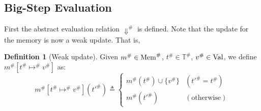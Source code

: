 \documentclass[acmsmall,screen]{acmart}
\theoremstyle{definition}
\newtheorem{definition}{Definition}[section]
\newcommand*{\A}[1]{{#1}^{\#}}
\newcommand*{\Time}{\mathbb{T}}
\newcommand*{\ATime}{\A{\Time}}
\newcommand*{\Value}[1]{\text{Val}\vphantom{#1}}
\newcommand*{\mem}{m}
\newcommand*{\AMem}[1]{\A{\text{Mem}}\vphantom{#1}}
\begin{document}
\subsection{Big-Step Evaluation}

First the abstract evaluation relation $\A{\Downarrow}$ is defined.
Note that the update for the memory is now a weak update. That is,
\begin{definition}[Weak update]
  Given $\A{\mem}\in\AMem{\ATime}$, $\A{t}\in\ATime$, $\A{v}\in\Value{\ATime}$, we define $\A{\mem}[\A{t}\A{\mapsto}\A{v}]$ as:
  \[
    \A{\mem}[\A{t}\A{\mapsto}\A{v}](\A{t'})\triangleq
    \begin{cases}
      \A{\mem}(\A{t})\cup\{\A{v}\} & (\A{t'}=\A{t})     \\
      \A{\mem}(\A{t'})             & (\text{otherwise})
    \end{cases}
  \]
\end{definition}
\end{document}
